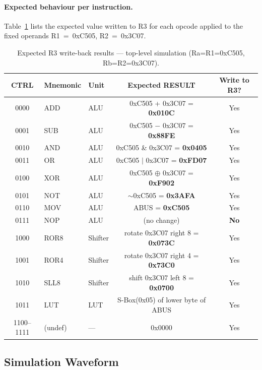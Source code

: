 \documentclass[12pt, a4paper]{report}
\begin{document}
\paragraph{Expected behaviour per instruction.}
Table~\ref{tab:sys_expected} lists the expected value written to R3 for each
opcode applied to the fixed operands R1~=~0xC505, R2~=~0x3C07.

\begin{table}[H]
\centering
\caption{Expected R3 write-back results — top-level simulation
         (Ra=R1=0xC505, Rb=R2=0x3C07).}
\label{tab:sys_expected}
\begin{tabular}{cllcc}
\toprule
\textbf{CTRL} & \textbf{Mnemonic} & \textbf{Unit}   &
\textbf{Expected RESULT} & \textbf{Write to R3?} \\
\midrule
0000 & ADD  & ALU     & 0xC505 + 0x3C07 = \textbf{0x010C} & Yes \\
0001 & SUB  & ALU     & 0xC505 $-$ 0x3C07 = \textbf{0x88FE} & Yes \\
0010 & AND  & ALU     & 0xC505 \& 0x3C07 = \textbf{0x0405} & Yes \\
0011 & OR   & ALU     & 0xC505 $|$ 0x3C07 = \textbf{0xFD07} & Yes \\
0100 & XOR  & ALU     & 0xC505 $\oplus$ 0x3C07 = \textbf{0xF902} & Yes \\
0101 & NOT  & ALU     & $\sim$0xC505 = \textbf{0x3AFA} & Yes \\
0110 & MOV  & ALU     & ABUS = \textbf{0xC505} & Yes \\
0111 & NOP  & ALU     & (no change) & \textbf{No} \\
1000 & ROR8 & Shifter & rotate 0x3C07 right 8 = \textbf{0x073C} & Yes \\
1001 & ROR4 & Shifter & rotate 0x3C07 right 4 = \textbf{0x73C0} & Yes \\
1010 & SLL8 & Shifter & shift 0x3C07 left 8   = \textbf{0x0700} & Yes \\
1011 & LUT  & LUT     & S-Box(0x05) of lower byte of ABUS & Yes \\
1100--1111 & (undef) & — & 0x0000 & Yes \\
\bottomrule
\end{tabular}
\end{table}

\subsection{Simulation Waveform}
\end{document}
